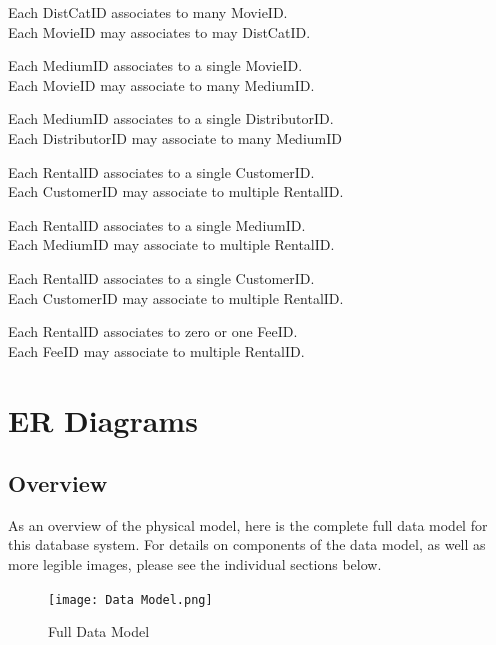 \documentclass[letterpaper,12pt]{article}
\begin{document}
Each DistCatID associates to many MovieID.\\
Each MovieID may associates to may DistCatID.

Each MediumID associates to a single MovieID.\\
Each MovieID may associate to many MediumID.

Each MediumID associates to a single DistributorID.\\
Each DistributorID may associate to many MediumID

Each RentalID associates to a single CustomerID.\\
Each CustomerID may associate to multiple RentalID.

Each RentalID associates to a single MediumID.\\
Each MediumID may associate to multiple RentalID.

Each RentalID associates to a single CustomerID.\\
Each CustomerID may associate to multiple RentalID.

Each RentalID associates to zero or one  FeeID.\\
Each FeeID may associate to multiple RentalID.
\section{ER Diagrams}
\subsection{Overview}
As an overview of the physical model, here is the complete full data model for this database system.  For details on components of the data model, as well as more legible images, please see the individual sections below.
\begin{figure}[H]
	\centering
	\caption{Full Data Model}
	\label{fig:Full_Data_Model}
	\texttt{[image: Data Model.png]}
\end{figure}
\end{document}

